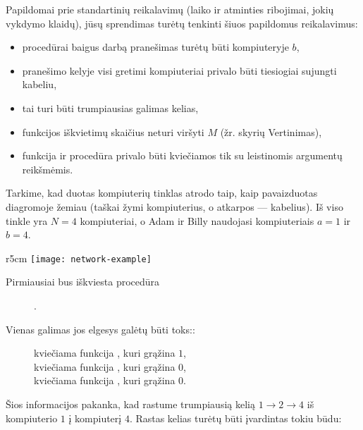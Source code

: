 \documentclass{boi2014-lt}
\begin{document}
    Papildomai prie standartinių reikalavimų (laiko ir atminties ribojimai,
    jokių vykdymo klaidų), jūsų sprendimas turėtų tenkinti šiuos papildomus
    reikalavimus:

    \begin{itemize}
        \item procedūrai  baigus darbą pranešimas turėtų būti
            kompiuteryje $b$,
        \item pranešimo kelyje visi gretimi kompiuteriai privalo būti tiesiogiai
            sujungti kabeliu,
        \item tai turi būti trumpiausias galimas kelias,
        \item funkcijos  iškvietimų skaičius neturi viršyti $M$
            (žr. skyrių Vertinimas),
        \item funkcija  ir procedūra  privalo būti
            kviečiamos tik su leistinomis argumentų reikšmėmis.
    \end{itemize}

    \Example
    Tarkime, kad duotas kompiuterių tinklas atrodo taip, kaip pavaizduotas
    diagromoje žemiau (taškai žymi kompiuterius, o atkarpos --- kabelius). Iš
    viso tinkle yra $N = 4$ kompiuteriai, o Adam ir Billy naudojasi
    kompiuteriais $a = 1$ ir $b = 4$.

    \begin{wrapfigure}[1]{r}{5cm}
        \texttt{[image: network-example]}
    \end{wrapfigure}

    Pirmiausiai bus iškviesta procedūra
    \begin{figure}[H]
        \centering
        .
    \end{figure}

    Vienas galimas jos elgesys galėtų būti toks::

    \begin{figure}[H]
        \centering
        kviečiama funkcija , kuri grąžina $1$, \\
        kviečiama funkcija , kuri grąžina $0$, \\
        kviečiama funkcija , kuri grąžina $0$.
    \end{figure}

    Šios informacijos pakanka, kad rastume trumpiausią kelią $1 \to 2 \to 4$ iš
    kompiuterio $1$ į kompiuterį $4$. Rastas kelias turėtų būti įvardintas tokiu
    būdu:
\end{document}
